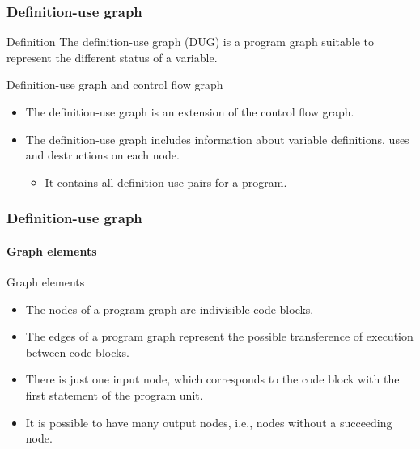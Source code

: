\begin{frame}[parent={cmap:structural-software-testing},hasnext=true,hasprev=true]
\frametitle{Definition-use graph}
\label{concept:program-graph}
\label{concept:definition-use-graph}
\label{concept:dug}

\begin{block:concept}{Definition}
The definition-use graph (DUG) is a program graph suitable to represent the
different status of a variable.
\end{block:concept}

\begin{block:fact}{Definition-use graph and control flow graph}
\begin{itemize}
	\item The definition-use graph is an extension of the control flow graph.

	\item The definition-use graph includes information about variable
	definitions, uses and destructions on each node.
	\begin{itemize}
		\item It contains all definition-use pairs for a program.
	\end{itemize}
\end{itemize}
\end{block:fact}
\end{frame}


\begin{frame}
\frametitle{Definition-use graph}
\framesubtitle{Graph elements}
\label{concept:cfg-graph-elements}

\begin{block:fact}{Graph elements}
\begin{itemize}
	\item The nodes of a program graph are indivisible code blocks.

	\item The edges of a program graph represent the possible transference of
	execution between code blocks.

	\item There is just one input node, which corresponds to the code block
	with the first statement of the program unit.

	\item It is possible to have many output nodes, i.e., nodes without a
	succeeding node.
\end{itemize}
\end{block:fact}

\hfill
{}
\end{frame}


